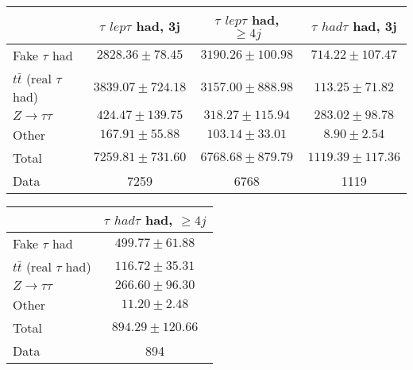 \begin{table}
\begin{center}
  \begin{tabular}{ | l |  c |  c |  c | }
    \hline \hline 
     &  $\tau$ ${lep}\tau$ {had}, 3j  &  $\tau$ ${lep}\tau$ {had}, $\geq4j$  &  $\tau$ ${had}\tau$ {had}, 3j  \\ 
    \hline 
     Fake $\tau$ {had}  &   $ 2828.36 \pm 78.45 $ &   $ 3190.26 \pm 100.98 $ &   $ 714.22 \pm 107.47 $ \\ 
     $t\bar{t}$ (real $\tau$ {had})  &   $ 3839.07 \pm 724.18 $ &   $ 3157.00 \pm 888.98 $ &   $ 113.25 \pm 71.82 $ \\ 
     $Z\rightarrow\tau\tau$  &   $ 424.47 \pm 139.75 $ &   $ 318.27 \pm 115.94 $ &   $ 283.02 \pm 98.78 $ \\ 
    Other  &   $ 167.91 \pm 55.88 $ &   $ 103.14 \pm 33.01 $ &   $ 8.90 \pm 2.54 $ \\ 
    Total  &   $ 7259.81 \pm 731.60 $ &   $ 6768.68 \pm 879.79 $ &   $ 1119.39 \pm 117.36 $ \\ 
    \hline 
    Data  & 7259  & 6768  & 1119  \\ 
    \hline \hline 
  \end{tabular} 


  \begin{tabular}{ | l |  c | }
    \hline \hline 
     &  $\tau$ ${had}\tau$ {had}, $\geq4j$  \\ 
    \hline 
     Fake $\tau$ {had}  &   $ 499.77 \pm 61.88 $ \\ 
     $t\bar{t}$ (real $\tau$ {had})  &   $ 116.72 \pm 35.31 $ \\ 
     $Z\rightarrow\tau\tau$  &   $ 266.60 \pm 96.30 $ \\ 
    Other  &   $ 11.20 \pm 2.48 $ \\ 
    Total  &   $ 894.29 \pm 120.66 $ \\ 
    \hline 
    Data  & 894  \\ 
    \hline \hline 
  \end{tabular} 


\end{center}
\end{table}
